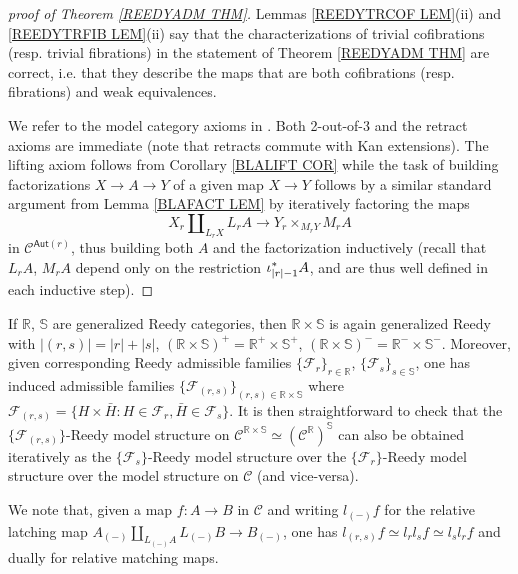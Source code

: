\documentclass[a4paper,10pt
 ,draft
]{article}%
\begin{document}
\begin{proof}[proof of Theorem \ref{REEDYADM THM}]
Lemmas \ref{REEDYTRCOF LEM}(ii) and \ref{REEDYTRFIB LEM}(ii) say that the characterizations of trivial cofibrations (resp. trivial fibrations) in the statement of Theorem \ref{REEDYADM THM} are correct, i.e. that they describe the maps that are both cofibrations (resp. fibrations) and weak equivalences.	

	We refer to the model category axioms in \cite[Def. 1.1.3]{Hov99}. 	
	Both 2-out-of-3 and the retract axioms are immediate
(note that retracts commute with Kan extensions).	
	The lifting axiom follows from Corollary \ref{BLALIFT COR}
	while the task of building factorizations $X \to A \to Y$ of a given map $X \to Y$ follows by a similar standard argument from Lemma \ref{BLAFACT LEM} by iteratively factoring the maps
\[
	X_r \amalg_{L_r X} L_r A \to Y_r \times_{M_r Y} M_r A
\]
in $\mathcal{C}^{\mathsf{Aut}(r)}$, 
thus building both $A$ and the factorization inductively
(recall that $L_r A$, $M_r A$ depend only on 
the restriction $\iota_{|r|-1}^{\**} A$, and are thus well defined in each inductive step).
\end{proof}




\begin{remark}\label{ITERREEDY REM}
If $\mathbb{R}$, $\mathbb{S}$ are generalized Reedy categories,
then 
$\mathbb{R} \times \mathbb{S}$ is again generalized Reedy 
with $|(r,s)| = |r|+|s|$,  
$\left(\mathbb{R} \times \mathbb{S}\right)^+ =
\mathbb{R}^+ \times \mathbb{S}^+$,
$\left(\mathbb{R} \times \mathbb{S}\right)^- =
\mathbb{R}^- \times \mathbb{S}^-$.
Moreover, given corresponding Reedy admissible families
$\{\mathcal{F}_r\}_{r \in \mathbb{R}}$,
$\{\mathcal{F}_s\}_{s \in \mathbb{S}}$,
one has induced admissible families 
$\{\mathcal{F}_{(r,s)}\}_{(r,s) \in \mathbb{R} \times \mathbb{S}}$
where 
$\mathcal{F}_{(r,s)} =
\{H \times \bar{H} \colon H \in \mathcal{F}_r,\bar{H} \in \mathcal{F}_s\}$.
It is then straightforward to check that the $\{\mathcal{F}_{(r,s)}\}$-Reedy model structure on 
$\mathcal{C}^{\mathbb{R} \times \mathbb{S}}
\simeq (\mathcal{C}^{\mathbb{R}} )^{\mathbb{S}}$
can also be obtained iteratively as the
$\{\mathcal{F}_{s}\}$-Reedy model structure over the 
$\{\mathcal{F}_{r}\}$-Reedy model structure over the model structure on $\mathcal{C}$ (and vice-versa).

We note that, given a map $f \colon A \to B$ in $\mathcal{C}$
and writing $l_{(-)}f$
for the relative latching map
$A_{(-)} \amalg_{L_{(-)}A} L_{(-)}B
\to B_{(-)}$,
one has $l_{(r,s)} f \simeq l_r l_s f \simeq l_s l_r f$
and dually for relative matching maps.
\end{remark}
\end{document}
